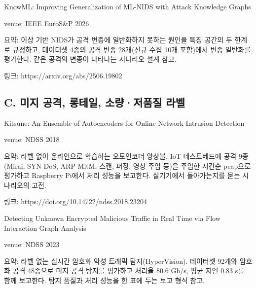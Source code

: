 \par\noindent \textbullet\enspace KnowML: Improving Generalization of ML-NIDS with Attack Knowledge Graphs


\par\noindent \textbullet\enspace venue: IEEE EuroS\&P 2026


\par\noindent \textbullet\enspace 요약: 이상 기반 NIDS가 공격 변종에 일반화하지 못하는 원인을 특징 공간의 두 한계로 규정하고, 데이터셋 4종의 공격 변종 28개(신규 수집 10개 포함)에서 변종 일반화를 평가한다. 같은 공격의 변종이 나타나는 시나리오 설계 참고.


\par\noindent \textbullet\enspace 링크: https:/\allowbreak{}/\allowbreak{}arxiv.org/\allowbreak{}abs/\allowbreak{}2506.19802


\subsection{C. 미지 공격, 롱테일, 소량·저품질 라벨}
\par\noindent \textbullet\enspace Kitsune: An Ensemble of Autoencoders for Online Network Intrusion Detection


\par\noindent \textbullet\enspace venue: NDSS 2018


\par\noindent \textbullet\enspace 요약: 라벨 없이 온라인으로 학습하는 오토인코더 앙상블. IoT 테스트베드에 공격 9종(Mirai, SYN DoS, ARP MitM, 스캔, 퍼징, 영상 주입 등)을 주입한 시간순 pcap으로 평가하고 Raspberry Pi에서 처리 성능을 보고한다. 실기기에서 돌아가는지를 묻는 시나리오의 고전.


\par\noindent \textbullet\enspace 링크: https:/\allowbreak{}/\allowbreak{}doi.org/\allowbreak{}10.14722/\allowbreak{}ndss.2018.23204


\par\noindent \textbullet\enspace Detecting Unknown Encrypted Malicious Traffic in Real Time via Flow Interaction Graph Analysis


\par\noindent \textbullet\enspace venue: NDSS 2023


\par\noindent \textbullet\enspace 요약: 라벨 없는 실시간 암호화 악성 트래픽 탐지(HyperVision). 데이터셋 92개와 암호화 공격 48종으로 미지 공격 탐지를 평가하고 처리율 80.6 Gb/\allowbreak{}s, 평균 지연 0.83 s를 함께 보고한다. 탐지 품질과 처리 성능을 한 표에 두는 보고 형식 참고.


